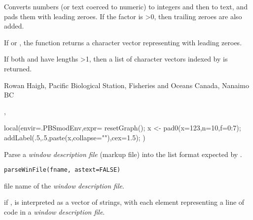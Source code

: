 \documentclass[letterpaper]{book}
\begin{document}
%
\begin{Details}\relax
Converts numbers (or text coerced to numeric) to integers and then to text,
and pads them with leading zeroes. If the factor  is >0, then 
trailing zeroes are also added.
\end{Details}
%
\begin{Value}
If  or , the function returns 
a character vector representing  with leading zeroes.

If both  and  have lengths >1, then a list of 
character vectors indexed by  is returned.
\end{Value}
%
\begin{Author}\relax
Rowan Haigh, Pacific Biological Station, Fisheries and Oceans Canada, Nanaimo BC
\end{Author}
%
\begin{SeeAlso}\relax
{}, 
\end{SeeAlso}
%
\begin{Examples}
\begin{ExampleCode}
local(envir=.PBSmodEnv,expr={
  resetGraph(); x <- pad0(x=123,n=10,f=0:7);
  addLabel(.5,.5,paste(x,collapse="\n"),cex=1.5);
})
\end{ExampleCode}
\end{Examples}
%
\begin{Description}\relax
Parse a \emph{window description file} (markup file) into 
the list format expected by .
\end{Description}
%
\begin{Usage}
\begin{verbatim}
parseWinFile(fname, astext=FALSE)
\end{verbatim}
\end{Usage}
%
\begin{Arguments}
\begin{ldescription}
\item[\code{fname}] file name of the \emph{window description file}.
\item[\code{astext}] if ,  is interpreted as a vector of strings, 
with each element representing a line of code in a \emph{window description file}.
\end{ldescription}
\end{Arguments}
\end{document}
